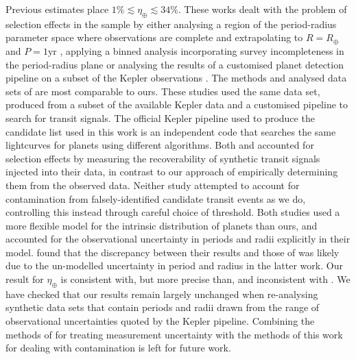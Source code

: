 \documentclass[apjl]{emulateapj}
\newcommand{\etaearth}{\eta_\oplus}
\newcommand{\REarth}{R_\oplus}
\begin{document}
Previous estimates
\citep{Catanzarite2011,Traub2012,Dong2013,Petigura2013,Foreman-Mackey2014}
place $1\% \lesssim \etaearth \lesssim 34\%$.  These works dealt with
the problem of selection effects in the sample by either analysing a
region of the period-radius parameter space where observations are
complete and extrapolating to $R = \REarth$ and $P = 1 \mathrm{yr}$
\citep{Catanzarite2011,Traub2012}, applying a binned analysis
incorporating survey incompleteness in the period-radius plane
\citep{Dong2013,Petigura2013} or analysing the results of a customised
planet detection pipeline on a subset of the Kepler observations
\citep{Petigura2013,Foreman-Mackey2014}.  The methods and analysed
data sets of \citet{Petigura2013,Foreman-Mackey2014} are most
comparable to ours.  These studies used the same data set, produced
\citep{Petigura2013} from a subset of the available Kepler data and a
customised pipeline to search for transit signals.  The official
Kepler pipeline used to produce the candidate list used in this work
is an independent code that searches the same lightcurves for planets
using different algorithms. Both \citet{Petigura2013} and
\citet{Foreman-Mackey2014} accounted for selection effects by
measuring the recoverability of synthetic transit signals injected
into their data, in contrast to our approach of empirically
determining them from the observed data.  Neither study attempted to
account for contamination from falsely-identified candidate transit
events as we do, controlling this instead through careful choice of
threshold.  Both studies used a more flexible model for the intrinsic
distribution of planets than ours, and \citet{Foreman-Mackey2014}
accounted for the observational uncertainty in periods and radii
explicitly in their model.  \citet{Foreman-Mackey2014} found that the
discrepancy between their results and those of \citet{Petigura2013}
was likely due to the un-modelled uncertainty in period and radius in
the latter work.  Our result for $\etaearth$ is consistent with, but
more precise than, \citet{Foreman-Mackey2014} and inconsistent with
\citet{Petigura2013}.  We have checked that our results remain largely
unchanged when re-analysing synthetic data sets that contain periods
and radii drawn from the range of observational uncertainties quoted
by the Kepler pipeline.  Combining the methods of
\citet{Foreman-Mackey2014} for treating measurement uncertainty with
the methods of this work for dealing with contamination is left for
future work.

\acknowledgements
\end{document}
